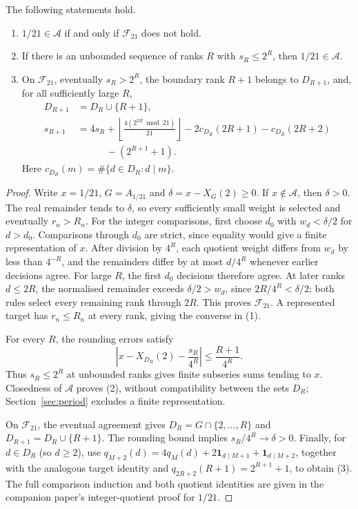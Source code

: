 \documentclass[11pt]{article}
\newcommand{\Ach}{\mathcal A}
\begin{document}
\begin{theorem}
\label{res:one-over-twenty-one-frontier}
The following statements hold.
\begin{enumerate}
\item $1/21\in\Ach$ if and only if $\mathcal F_{21}$ does not hold.
\item If there is an unbounded sequence of ranks $R$ with $s_R\le 2^R$,
  then $1/21\in\Ach$.
\item On $\mathcal F_{21}$, eventually $s_R>2^R$, the boundary rank $R+1$
  belongs to $D_{R+1}$, and, for all sufficiently large $R$,
\[
 \begin{aligned}
 D_{R+1}&=D_R\cup\{R+1\},\\
 s_{R+1}&=4s_R+
 \left\lfloor\frac{4(2^{2R}\bmod21)}{21}\right\rfloor
 -2c_{D_R}(2R+1)-c_{D_R}(2R+2)\\
 &\hspace{3em}{}-(2^{R+1}+1).
 \end{aligned}
\]
Here $c_{D_R}(m)=\#\{d\in D_R:d\mid m\}$.
\end{enumerate}
\end{theorem}

\begin{proof}
Write $x=1/21$, $G=A_{1/21}$ and $\delta=x-X_G(2)\ge0$.
If $x\notin\Ach$, then $\delta>0$. The real remainder tends to
$\delta$, so every sufficiently small weight is selected and eventually
$r_n>R_n$. For the integer comparisons, first choose $d_0$ with $w_d<\delta/2$
for $d>d_0$. Comparisons through $d_0$ are strict,
since equality would give a finite representation of $x$.
After division by $4^R$, each quotient weight differs from $w_d$ by
less than $4^{-R}$, and the remainders differ by at most $d/4^R$
whenever earlier decisions agree. For large $R$, the first $d_0$
decisions therefore agree. At later ranks $d\le2R$, the normalised
remainder exceeds $\delta/2>w_d$, since $2R/4^R<\delta/2$;
both rules select every remaining rank through $2R$. This proves $\mathcal F_{21}$. A represented target has
$r_n\le R_n$ at every rank, giving the converse in (1).

For every $R$, the rounding errors satisfy
\begin{equation}
 \left|x-X_{D_R}(2)-\frac{s_R}{4^R}\right|
 \le\frac{R+1}{4^R}.
 \label{eq:twenty-one-rounding}
\end{equation}
Thus $s_R\le2^R$ at unbounded ranks gives finite subseries sums
tending to $x$. Closedness of $\Ach$ proves (2), without compatibility
between the sets $D_R$; Section~\ref{sec:period} excludes a finite
representation.

On $\mathcal F_{21}$, the eventual agreement gives
$D_R=G\cap\{2,\ldots,R\}$ and $D_{R+1}=D_R\cup\{R+1\}$.
The rounding bound implies $s_R/4^R\to\delta>0$.
Finally, for $d\in D_R$ (so $d\ge2$), use
$q_{M+2}(d)=4q_M(d)+2\mathbf1_{d\mid M+1}+\mathbf1_{d\mid M+2}$,
together with the analogous target identity and
$q_{2R+2}(R+1)=2^{R+1}+1$, to obtain (3).
The full comparison induction and both quotient identities are given in
{the companion paper's integer-quotient proof for $1/21$}.
\end{proof}
\end{document}
